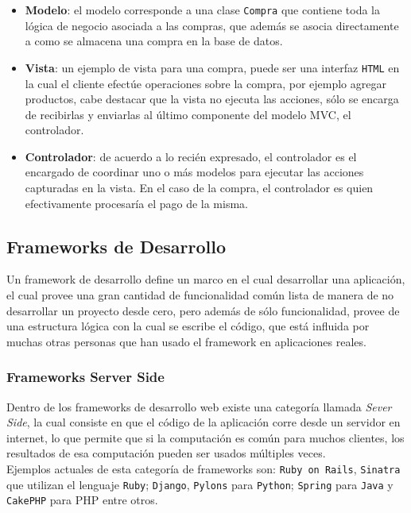\begin{itemize}
  \item \textbf{Modelo}: el modelo corresponde a una clase \texttt{Compra} que contiene toda la lógica de negocio asociada a las compras, que además se asocia directamente a como se almacena una compra en la base de datos.
  \item \textbf{Vista}: un ejemplo de vista para una compra, puede ser una interfaz \texttt{HTML} en la cual el cliente efectúe operaciones sobre la compra, por ejemplo agregar productos, cabe destacar que la vista no ejecuta las acciones, sólo se encarga de recibirlas y enviarlas al último componente del modelo MVC, el controlador.
  \item \textbf{Controlador}: de acuerdo a lo recién expresado, el controlador es el encargado de coordinar uno o más modelos para ejecutar las acciones capturadas en la vista. En el caso de la compra, el controlador es quien efectivamente procesaría el pago de la misma.
\end{itemize}

\subsection{Frameworks de Desarrollo} %
\label{sub:frameworks_de_desarollo}
Un framework de desarrollo define un marco en el cual desarrollar una aplicación, el cual provee una gran cantidad de funcionalidad común lista de manera de no desarrollar un proyecto desde cero, pero además de sólo funcionalidad, provee de una estructura lógica con la cual se escribe el código, que está influida por muchas otras personas que han usado el framework en aplicaciones reales.

\subsubsection{Frameworks Server Side} %
\label{ssub:frameworks_server_side}
Dentro de los frameworks de desarrollo web existe una categoría llamada \emph{Sever Side}, la cual consiste en que el código de la aplicación corre desde un servidor en internet, lo que permite que si la computación es común para muchos clientes, los resultados de esa computación pueden ser usados múltiples veces.\\

Ejemplos actuales de esta categoría de frameworks son: \texttt{Ruby on Rails}\cite{rails}, \texttt{Sinatra}\cite{sinatra} que utilizan el lenguaje \texttt{Ruby}; \texttt{Django}\cite{django}, \texttt{Pylons}\cite{pylons} para \texttt{Python}; \texttt{Spring}\cite{spring} para \texttt{Java} y \texttt{CakePHP}\cite{cake} para PHP entre otros.

